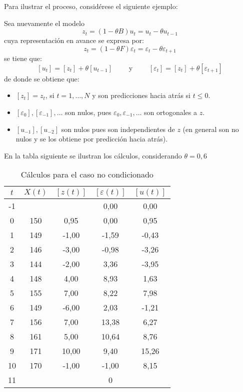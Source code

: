 Para ilustrar el proceso, consid\'{e}rese el siguiente ejemplo:

\begin{ejemplo}
Sea nuevamente el modelo
\[
z_{t} =\left( {1-\theta B} \right)u_{t} =u_{t} -\theta u_{t-1} 
\]
cuya representaci\'{o}n en avance se expresa por:
\[
z_{t} =\left( {1-\theta F} \right)\varepsilon_{t} =\varepsilon_{t} -\theta 
\varepsilon_{t+1} 
\]
se tiene que:
\[
\left[ {u_{t} } \right]=\left[ {z_{t} } \right]+\theta \left[ {u_{t-1} } 
\right]\qquad \text{ y }\qquad \left[ {\varepsilon_{t} } \right]=\left[ {z_{t} 
} \right]+\theta \left[ {\varepsilon_{t+1} } \right]
\]
de donde se obtiene que:
\begin{itemize}
\item $\left[ {z_{t} } \right]=z_{t}$, si $t=1,\ldots,N$ y son predicciones hacia atr\'{a}s si $t\leq 0$.

\item $\left[ {\varepsilon_{0} } \right],\left[ {\varepsilon_{-1} } \right],\ldots $ son nulos, pues $\varepsilon_{0} ,\varepsilon_{-1} ,\ldots $ son ortogonales a $z$.

\item $\left[ {u_{-1} } \right],\left[ {u_{-2} } \right]$ son nulos pues son independientes de $z$ (en general son no nulos y se los obtiene por predicci\'{o}n hacia atr\'{a}s).
\end{itemize}

En la tabla siguiente se ilustran los c\'{a}lculos, considerando $\theta =0,6$

\begin{table}[H]
\centering\small
\caption{C\'{a}lculos para el caso no condicionado}
\begin{tabular}{@{}ccccc@{}}
\toprule
$t$& $X(t)$& $[z(t)]$& $[\varepsilon(t)]$& $[u(t)]$ \\
\midrule
-1&  &  & 0,00& 0,00 \\
0& 150& 0,95& 0,00& 0,95 \\
1& 149& -1,00& -1,59& -0,43 \\
2& 146& -3,00& -0,98& -3,26 \\
3& 144& -2,00& 3,36& -3,95 \\
4& 148& 4,00& 8,93& 1,63 \\
5& 155& 7,00& 8,22& 7,98 \\
6& 149& -6,00& 2,03& -1,21 \\
7& 156& 7,00& 13,38& 6,27 \\
8& 161& 5,00& 10,64& 8,76 \\
9& 171& 10,00& 9,40& 15,26 \\
10& 170& -1,00& -1,00& 8,15 \\
11& & & 0&  \\
\bottomrule
\end{tabular}
\end{table}


\end{ejemplo}
